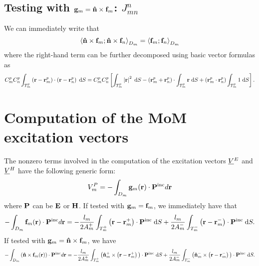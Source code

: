 \subsection{Testing with $\mathbf{g}_m = \mathbf{\Hat{n}} \times \mathbf{f}_m$: $J_{mn}^n$}
%
\par
We can immediately write that
\begin{equation}
\left\langle \mathbf{\Hat{n}} \times \mathbf{f}_m ; \mathbf{\Hat{n}} \times \mathbf{f}_n \right\rangle_{D_m} = \left\langle \mathbf{f}_m ; \mathbf{f}_n \right\rangle_{D_m} 
\end{equation}
where the right-hand term can be further decomposed using basic vector formulas as
\begin{equation} \label{eqn:MMPIE_J_n_x_RWG_testing_diag_term}
C_m^p C_n^p \int_{T_m^p} \left(\mathbf{r}-\mathbf{r}_m^p \right) \cdot \left(\mathbf{r}-\mathbf{r}_n^p\right) \; \text{d} S = C_m^p C_n^p \left[ \int_{T_m^p} \left|\mathbf{r}\right|^2 \; \text{d} S - \left(\mathbf{r}_m^p + \mathbf{r}_n^p \right) \cdot \int_{T_m^p} \mathbf{r} \; \text{d} S + \left(\mathbf{r}_m^p \cdot \mathbf{r}_n^p \right) \int_{T_m^p} 1 \; \text{d} S\right].
\end{equation}


\section{Computation of the MoM excitation vectors}
\label{app:Computation of the MoM excitation vectors}
%
\par
The nonzero terms involved in the computation of the excitation vectors $\underline{V} \thinspace \negthinspace _{} ^{E}$ and $\underline{V} \thinspace \negthinspace _{} ^{H}$ have the following generic form:
\begin{equation}
V_m^{P} = -\int_{D_m}\mathbf{g}_m \!\left(\mathbf{r}\right) \cdot \mathbf{P}^\text{inc} d\mathbf{r}
\end{equation}
where $\mathbf{P}$ can be $\mathbf{E}$ or $\mathbf{H}$. If tested with $\mathbf{g}_m = \mathbf{f}_m$, we immediately have that
\begin{equation}
-\int_{D_m}\mathbf{f}_m \!\left(\mathbf{r}\right) \cdot \mathbf{P}^\text{inc} d\mathbf{r} = -\frac{l_m}{2 A_m^+}\int_{T_m^+} \left(\mathbf{r} - \mathbf{r}_m^+ \right) \cdot \mathbf{P}^\text{inc} \; \text{d} S + \frac{l_m}{2 A_m^-}\int_{T_m^-} \left(\mathbf{r} - \mathbf{r}_m^- \right) \cdot \mathbf{P}^\text{inc} \; \text{d} S.
\end{equation}
If tested with $\mathbf{g}_m = \mathbf{\Hat{n}} \times \mathbf{f}_m$, we have 
\begin{equation}
-\int_{D_m} \left(\mathbf{\Hat{n}}\times\mathbf{f}_m\!\left(\mathbf{r}\right)\right)  \cdot \mathbf{P}^\text{inc} d\mathbf{r} = -\frac{l_m}{2 A_m^+}\int_{T_m^+} \big( \mathbf{\Hat{n}}_m^+ \times \left(\mathbf{r} - \mathbf{r}_m^+ \right) \big) \cdot \mathbf{P}^\text{inc} \; \text{d} S + \frac{l_m}{2 A_m^-}\int_{T_m^-} \big( \mathbf{\Hat{n}}_m^- \times \left(\mathbf{r} - \mathbf{r}_m^- \right)\big) \cdot \mathbf{P}^\text{inc} \; \text{d} S.
\end{equation}

